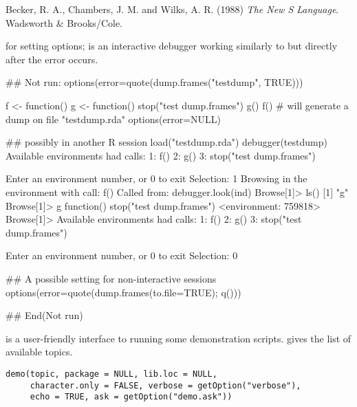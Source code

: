 %
\begin{References}\relax
Becker, R. A., Chambers, J. M. and Wilks, A. R. (1988)
\emph{The New S Language}.
Wadsworth \& Brooks/Cole.
\end{References}
%
\begin{SeeAlso}\relax
{} for setting  options;
 is an interactive debugger working similarly to
 but directly after the error occurs.
\end{SeeAlso}
%
\begin{Examples}
\begin{ExampleCode}
## Not run: 
options(error=quote(dump.frames("testdump", TRUE)))

f <- function() {
    g <- function() stop("test dump.frames")
    g()
}
f()   # will generate a dump on file "testdump.rda"
options(error=NULL)

## possibly in another R session
load("testdump.rda")
debugger(testdump)
Available environments had calls:
1: f()
2: g()
3: stop("test dump.frames")

Enter an environment number, or 0 to exit
Selection: 1
Browsing in the environment with call:
f()
Called from: debugger.look(ind)
Browse[1]> ls()
[1] "g"
Browse[1]> g
function() stop("test dump.frames")
<environment: 759818>
Browse[1]> 
Available environments had calls:
1: f()
2: g()
3: stop("test dump.frames")

Enter an environment number, or 0 to exit
Selection: 0

## A possible setting for non-interactive sessions
options(error=quote({dump.frames(to.file=TRUE); q()}))

## End(Not run)
\end{ExampleCode}
\end{Examples}
%
\begin{Description}\relax
{} is a user-friendly interface to running some demonstration
\R{} scripts.   gives the list of available topics.
\end{Description}
%
\begin{Usage}
\begin{verbatim}
demo(topic, package = NULL, lib.loc = NULL,
     character.only = FALSE, verbose = getOption("verbose"),
     echo = TRUE, ask = getOption("demo.ask"))
\end{verbatim}
\end{Usage}
